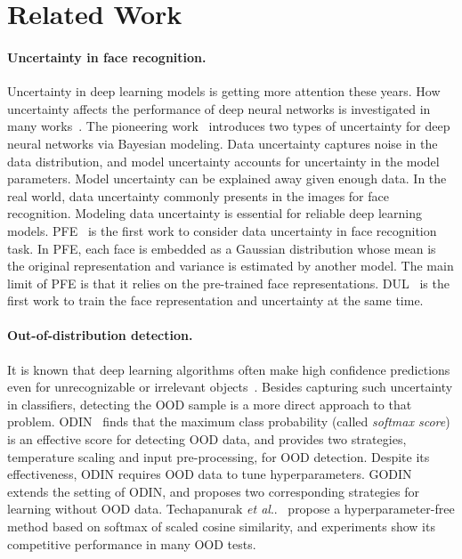 \documentclass[letterpaper]{article} %
\makeatletter
\DeclareRobustCommand\onedot{\futurelet\@let@token\@onedot}
\def\@onedot{\ifx\@let@token.\else.\null\fi\xspace}
\def\etal{\emph{et al}\onedot}
\makeatother
\begin{document}
\section{Related Work}
\label{sec:related}

\paragraph{Uncertainty in face recognition.}
%
Uncertainty in deep learning models is getting more attention these years. How uncertainty affects the performance of deep neural networks is investigated in many works~\cite{gal2016dropout,blundell2015weight,kendall2017uncertainties}.
%
The pioneering work~\cite{kendall2017uncertainties} introduces two types of uncertainty for deep neural networks via Bayesian modeling. Data uncertainty captures noise in the data distribution, and model uncertainty accounts for uncertainty in the model parameters. Model uncertainty can be explained away given enough data.
%
In the real world, data uncertainty commonly presents in the images for face recognition. Modeling data uncertainty is essential for reliable deep learning models.
%
PFE~\cite{shi2019probabilistic} is the first work to consider data uncertainty in face recognition task. In PFE, each face is embedded as a Gaussian distribution whose mean is the original representation and variance is estimated by another model. The main limit of PFE is that it relies on the pre-trained face representations.
%
DUL~\cite{chang2020data} is the first work to train the face representation and uncertainty at the same time.

\paragraph{Out-of-distribution detection.}
It is known that deep learning algorithms often make high confidence predictions even for unrecognizable or irrelevant objects~\cite{moosavi2017universal,nguyen2015deep}. Besides capturing such uncertainty in classifiers, detecting the OOD sample is a more direct approach to that problem.
%
ODIN~\cite{liang2018enhancing} finds that the maximum class probability (called \emph{softmax score}) is an effective score for detecting OOD data, and provides two strategies, temperature scaling and input pre-processing, for OOD detection. Despite its effectiveness, ODIN requires OOD data to tune hyperparameters.
%
GODIN~\cite{hsu2020generalized} extends the setting of ODIN, and proposes two corresponding strategies for learning without OOD data.
%
Techapanurak \etal~\cite{techapanurak2019hyperparameter} propose a hyperparameter-free method based on softmax of scaled cosine similarity, and experiments show its competitive performance in many OOD tests.
\end{document}
